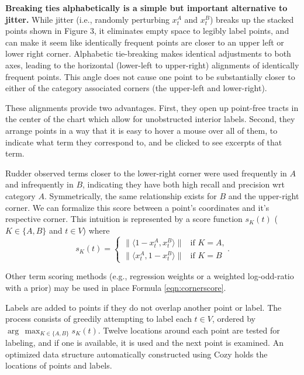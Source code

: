 \documentclass[11pt,a4paper]{article}
\begin{document}
\textbf{Breaking ties alphabetically is a simple but important alternative to jitter.} While jitter (i.e., randomly perturbing $x_{t}^{A}$ and $x_{t}^{B}$) breaks up the stacked points shown in Figure 3, it eliminates empty space to legibly label points, and can make it seem like identically frequent points are closer to an upper left or lower right corner.  Alphabetic tie-breaking makes identical adjustments to both axes, leading to the horizontal (lower-left to upper-right) alignments of identically frequent points.  This angle does not cause one point to be substantially closer to either of the category associated corners (the upper-left and lower-right). 

These alignments provide two advantages. First, they open up point-free tracts in the center of the chart which allow for unobstructed interior labels. Second, they arrange points in a way that it is easy to hover a mouse over all of them, to indicate what term they correspond to, and be clicked to see excerpts of that term.

Rudder  observed terms closer to the lower-right corner were used frequently in $A$ and infrequently in $B$, indicating they have both high recall and precision wrt category $A$.  Symmetrically, the same relationship exists for $B$ and the upper-right corner.  We can formalize this score between a point's coordinates and it's respective corner.  This intuition is represented by a score function $s_K(t)$ ($K\in\{A,B\}$ and $t\in V$) where
\vspace{-.3cm}
\begin{equation}
s_K(t)= 
\begin{cases} \|\langle 1-x_{t}^{A}, x_{t}^{B}\rangle\| & \text{if $K=A$,}
\\
\|\langle x_{t}^{A}, 1-x_{t}^{B}\rangle\| &\text{if $K=B$}
\end{cases}.
  \label{eqn:cornerscore}
\end{equation}

Other term scoring methods (e.g., regression weights or a weighted log-odd-ratio with a prior) may be used in place Formula \ref{eqn:cornerscore}.

Labels are added to points if they do not overlap another point or label.  The process consists of greedily attempting to label each $t \in V$, ordered by $\arg\,\max_{K\in \{A,B\}}s_K(t)$.  Twelve locations around each point are tested for labeling, and if one is available, it is used and the next point is examined.  An optimized data structure automatically constructed using Cozy \cite{cozy} holds the locations of points and labels. 
\end{document}
